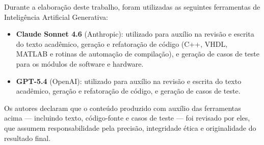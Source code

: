 

\noindent Durante a elaboração deste trabalho, foram utilizadas as seguintes ferramentas de Inteligência Artificial Generativa:

\begin{itemize}
  \item \textbf{Claude Sonnet 4.6} (Anthropic): utilizado para auxílio na revisão e escrita do texto acadêmico, geração e refatoração de código (C++, VHDL, MATLAB e rotinas de automação de compilação), e geração de casos de teste para os módulos de software e hardware.
  \item \textbf{GPT-5.4} (OpenAI): utilizado para auxílio na revisão e escrita do texto acadêmico, geração e refatoração de código, e geração de casos de teste.
\end{itemize}

\noindent Os autores declaram que o conteúdo produzido com auxílio das ferramentas acima --- incluindo texto, código-fonte e casos de teste --- foi revisado por eles, que assumem responsabilidade pela precisão, integridade ética e originalidade do resultado final.
